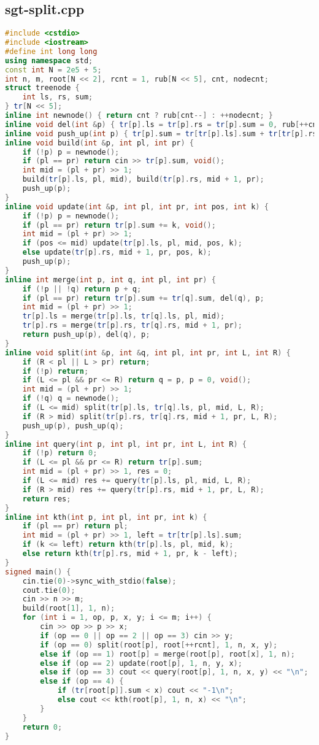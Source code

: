 \documentclass[9pt, a4paper, oneside]{book}
\begin{document}
\subsection{sgt-split.cpp}
\begin{lstlisting}[language={C++}]
#include <cstdio>
#include <iostream>
#define int long long
using namespace std;
const int N = 2e5 + 5;
int n, m, root[N << 2], rcnt = 1, rub[N << 5], cnt, nodecnt;
struct treenode {
    int ls, rs, sum;
} tr[N << 5];
inline int newnode() { return cnt ? rub[cnt--] : ++nodecnt; }
inline void del(int &p) { tr[p].ls = tr[p].rs = tr[p].sum = 0, rub[++cnt] = p, p = 0; }
inline void push_up(int p) { tr[p].sum = tr[tr[p].ls].sum + tr[tr[p].rs].sum; }
inline void build(int &p, int pl, int pr) {
    if (!p) p = newnode();
    if (pl == pr) return cin >> tr[p].sum, void();
    int mid = (pl + pr) >> 1;
    build(tr[p].ls, pl, mid), build(tr[p].rs, mid + 1, pr);
    push_up(p);
}
inline void update(int &p, int pl, int pr, int pos, int k) {
    if (!p) p = newnode();
    if (pl == pr) return tr[p].sum += k, void();
    int mid = (pl + pr) >> 1;
    if (pos <= mid) update(tr[p].ls, pl, mid, pos, k);
    else update(tr[p].rs, mid + 1, pr, pos, k);
    push_up(p);
}
inline int merge(int p, int q, int pl, int pr) {
    if (!p || !q) return p + q;
    if (pl == pr) return tr[p].sum += tr[q].sum, del(q), p;
    int mid = (pl + pr) >> 1;
    tr[p].ls = merge(tr[p].ls, tr[q].ls, pl, mid);
    tr[p].rs = merge(tr[p].rs, tr[q].rs, mid + 1, pr);
    return push_up(p), del(q), p;
}
inline void split(int &p, int &q, int pl, int pr, int L, int R) {
    if (R < pl || L > pr) return;
    if (!p) return;
    if (L <= pl && pr <= R) return q = p, p = 0, void();
    int mid = (pl + pr) >> 1;
    if (!q) q = newnode();
    if (L <= mid) split(tr[p].ls, tr[q].ls, pl, mid, L, R);
    if (R > mid) split(tr[p].rs, tr[q].rs, mid + 1, pr, L, R);
    push_up(p), push_up(q);
}
inline int query(int p, int pl, int pr, int L, int R) {
    if (!p) return 0;
    if (L <= pl && pr <= R) return tr[p].sum;
    int mid = (pl + pr) >> 1, res = 0;
    if (L <= mid) res += query(tr[p].ls, pl, mid, L, R);
    if (R > mid) res += query(tr[p].rs, mid + 1, pr, L, R);
    return res;
}
inline int kth(int p, int pl, int pr, int k) {
    if (pl == pr) return pl;
    int mid = (pl + pr) >> 1, left = tr[tr[p].ls].sum;
    if (k <= left) return kth(tr[p].ls, pl, mid, k);
    else return kth(tr[p].rs, mid + 1, pr, k - left);
}
signed main() {
    cin.tie(0)->sync_with_stdio(false);
    cout.tie(0);
    cin >> n >> m;
    build(root[1], 1, n);
    for (int i = 1, op, p, x, y; i <= m; i++) {
        cin >> op >> p >> x;
        if (op == 0 || op == 2 || op == 3) cin >> y;
        if (op == 0) split(root[p], root[++rcnt], 1, n, x, y);
        else if (op == 1) root[p] = merge(root[p], root[x], 1, n);
        else if (op == 2) update(root[p], 1, n, y, x);
        else if (op == 3) cout << query(root[p], 1, n, x, y) << "\n";
        else if (op == 4) {
            if (tr[root[p]].sum < x) cout << "-1\n";
            else cout << kth(root[p], 1, n, x) << "\n";
        }
    }
    return 0;
}\end{lstlisting}
\end{document}
